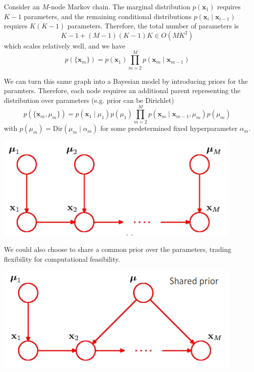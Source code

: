 \documentclass{article}
\begin{document}
      \begin{example}
        Consider an $M$-node Markov chain. The marginal distribution $p(\mathbf{x}_1)$ requires $K-1$ parameters, and the remaining conditional distributions $p(\mathbf{x}_i \mid \mathbf{x}_{i-1})$ requires $K(K-1)$ parameters. Therefore, the total number of parameters is 
      \[K-1 + (M-1) (K-1) K \in O(M K^2)\]
      which scales relatively well, and we have 
      \[p(\{\mathbf{x}_m\}) = p (\mathbf{x}_1) \prod_{m=2}^M p(\mathbf{x}_m \mid \mathbf{x}_{m-1})\]
      \begin{center}

      \end{center}
      We can turn this same graph into a Bayesian model by introducing priors for the paramters. Therefore, each node requires an additional parent representing the distribution over parameters (e.g. prior can be Dirichlet)  
      \[p(\{\mathbf{x}_m , \mu_m\}) = p(\mathbf{x}_1 \mid \mu_1) p(\mu_1) \prod_{m=2}^M p(\mathbf{x}_m \mid \mathbf{x}_{m-1}, \mu_m) p(\mu_m) \]
      with $p(\mu_m) = \mathrm{Dir}(\mu_m \mid \alpha_m)$ for some predetermined fixed hyperparameter $\alpha_m$. 
      \begin{center}
        \includegraphics[scale=0.5]{img/07_Boltzmann/dir_prior.png}
      \end{center}
      We could also choose to share a common prior over the parameters, trading flexibility for computational feasibility. 
      \begin{center}
        \includegraphics[scale=0.5]{img/07_Boltzmann/shared_dir_prior.png}
      \end{center}
      \end{example}
\end{document}
